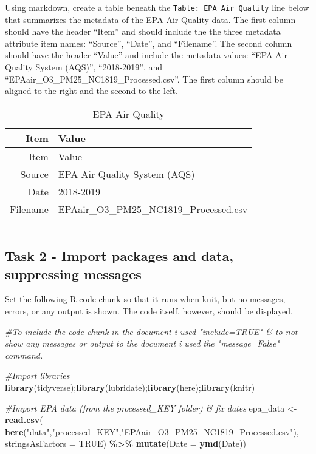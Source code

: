 \documentclass[
]{article}
\newenvironment{Shaded}{\begin{snugshade}}{\end{snugshade}}
\newcommand{\AttributeTok}[1]{\textcolor[rgb]{0.13,0.29,0.53}{#1}}
\newcommand{\CommentTok}[1]{\textcolor[rgb]{0.56,0.35,0.01}{\textit{#1}}}
\newcommand{\ConstantTok}[1]{\textcolor[rgb]{0.56,0.35,0.01}{#1}}
\newcommand{\FunctionTok}[1]{\textcolor[rgb]{0.13,0.29,0.53}{\textbf{#1}}}
\newcommand{\NormalTok}[1]{#1}
\newcommand{\OtherTok}[1]{\textcolor[rgb]{0.56,0.35,0.01}{#1}}
\newcommand{\SpecialCharTok}[1]{\textcolor[rgb]{0.81,0.36,0.00}{\textbf{#1}}}
\newcommand{\StringTok}[1]{\textcolor[rgb]{0.31,0.60,0.02}{#1}}
\begin{document}
Using markdown, create a table beneath the
\texttt{Table:\ EPA\ Air\ Quality} line below that summarizes the
metadata of the EPA Air Quality data. The first column should have the
header ``Item'' and should include the the three metadata attribute item
names: ``Source'', ``Date'', and ``Filename''. The second column should
have the header ``Value'' and include the metadata values: ``EPA Air
Quality System (AQS)'', ``2018-2019'', and
``EPAair\_O3\_PM25\_NC1819\_Processed.csv''. The first column should be
aligned to the right and the second to the left.

\begin{longtable}[]{@{}rl@{}}
\caption{EPA Air Quality}\tabularnewline
\toprule\noalign{}
Item & Value \\
\midrule\noalign{}
\endfirsthead
\toprule\noalign{}
Item & Value \\
\midrule\noalign{}
\endhead
\bottomrule\noalign{}
\endlastfoot
Source & EPA Air Quality System (AQS) \\
Date & 2018-2019 \\
Filename & EPAair\_O3\_PM25\_NC1819\_Processed.csv \\
\end{longtable}

\begin{center}\rule{0.5\linewidth}{0.5pt}\end{center}

\hypertarget{task-2---import-packages-and-data-suppressing-messages}{%
\subsection{Task 2 - Import packages and data, suppressing
messages}\label{task-2---import-packages-and-data-suppressing-messages}}

Set the following R code chunk so that it runs when knit, but no
messages, errors, or any output is shown. The code itself, however,
should be displayed.

\begin{Shaded}
\begin{Highlighting}[]
\CommentTok{\#To include the code chunk in the document i used "include=TRUE" \& to not show any messages or output to the document i used the "message=False" command. }

\CommentTok{\#Import libraries}
\FunctionTok{library}\NormalTok{(tidyverse);}\FunctionTok{library}\NormalTok{(lubridate);}\FunctionTok{library}\NormalTok{(here);}\FunctionTok{library}\NormalTok{(knitr)}

\CommentTok{\#Import EPA data (from the processed\_KEY folder) \& fix dates}
\NormalTok{epa\_data }\OtherTok{\textless{}{-}} \FunctionTok{read.csv}\NormalTok{(}
  \FunctionTok{here}\NormalTok{(}\StringTok{"data"}\NormalTok{,}\StringTok{"processed\_KEY"}\NormalTok{,}\StringTok{"EPAair\_O3\_PM25\_NC1819\_Processed.csv"}\NormalTok{),}
  \AttributeTok{stringsAsFactors =} \ConstantTok{TRUE}\NormalTok{) }\SpecialCharTok{\%\textgreater{}\%} 
  \FunctionTok{mutate}\NormalTok{(}\AttributeTok{Date =} \FunctionTok{ymd}\NormalTok{(Date))}
\end{Highlighting}
\end{Shaded}
\end{document}
